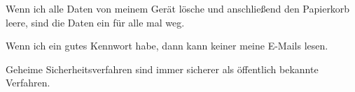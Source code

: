 \item Wenn ich alle Daten von meinem Gerät lösche und anschließend den Papierkorb leere, sind die Daten ein für alle mal weg.
\item Wenn ich ein gutes Kennwort habe, dann kann keiner meine E-Mails lesen.
\item Geheime Sicherheitsverfahren sind immer sicherer als öffentlich bekannte Verfahren.